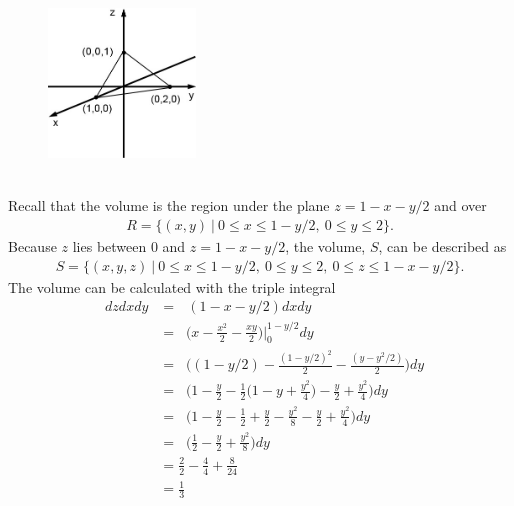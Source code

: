 \BEN
\item %
 \\
\begin{figure}[h]
  \vspace{-1pt}
  \begin{center}
    \includegraphics[width=0.35\textwidth]{TetExample.jpg}
  \end{center}
\end{figure}\\
Recall that the volume is the region under the plane $z = 1 - x - y/2$ and over  
\begin{align*}
  R = \{ (x,y) \ | \ 0 \le x \le 1- y/2, \ 0 \le y \le 2 \}.
\end{align*}
Because $z$ lies between 0 and $z = 1 - x - y/2$, the volume, $S$, can be described as
\begin{align*}
  S = \{ (x,y,z) \ | \ 0 \le x \le 1- y/2, \ 0 \le y \le 2, \ 0 \le z \le 1 - x - y/2 \}.
\end{align*}
The volume can be calculated with the triple integral
\begin{align*}
  \mathop{\int_{0}^{2} \! \int_0^{1-y/2} \int_0^{1-x-y/2} }dzdxdy
  &= \mathop{\int_{0}^{2} \! \int_0^{1-y/2}  } ( 1-x-y/2) dxdy\\
  &= \mathop{\int_{0}^{2}  } \Big( x-\frac{x^2}{2}-\frac{xy}{2}\Big)\Big|_0^{1-y/2} dy \\
  &= \mathop{\int_{0}^{2}  } \Big( (1-y/2)-\frac{(1-y/2)^2}{2}-\frac{(y-y^2/2)}{2}\Big) dy \\
  &= \mathop{\int_{0}^{2}  } \Bigg( 1 - \frac{y}{2}-\frac{1}{2}\Big(1 - y + \frac{y^2}{4}\Big)-\frac{y}{2}+\frac{y^2}{4}\Bigg) dy \\
  &= \mathop{\int_{0}^{2}  } \Bigg( 1 - \frac{y}{2} - \frac{1}{2} + \frac{y}{2} - \frac{y^2}{8} -\frac{y}{2}+\frac{y^2}{4}\Bigg) dy \\
  &= \mathop{\int_{0}^{2}  } \Big( \frac{1}{2} - \frac{y}{2} + \frac{y^2}{8} \Big) dy \\
  &= \frac{2}{2} - \frac{4}{4}  + \frac{8}{24} \\
  &= \frac{1}{3}
\end{align*} 
